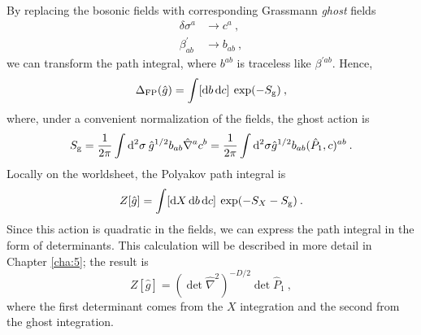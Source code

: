 By replacing the bosonic fields with corresponding Grassmann \emph{ghost} fields    
\begin{subequations} \label{3.3.19}
	\begin{align}
		\delta \sigma^{a} &\rightarrow c^{a} \:, \label{3.3.19a}\\
		\beta_{a b}^{\prime} & \rightarrow b_{a b} \:, \label{3.3.19b}
	\end{align}
\end{subequations}
we can transform the path integral, where $b^{a b}$ is traceless like $\beta^{\prime a b}$.    
Hence,    
\begin{equation}
	\Delta_{\mathrm{FP}}(\hat{g})=\int[\mathrm{d} b\, \mathrm{d} c] \: \exp (-S_{\mathrm{g}}) \:, \label{3.3.20}
\end{equation}
where, under a convenient normalization of the fields, the ghost action is    
\begin{equation}\label{3.3.21}
	S_{\mathrm{g}}=\frac{1}{2 \pi} \int \mathrm{d}^{2} \sigma \: \hat{g}^{1 / 2} b_{a b} \hat{\nabla}^{a} c^{b}=\frac{1}{2 \pi} \int \mathrm{d}^{2} \sigma \hat{g}^{1 / 2} b_{a b}(\hat{P}_{1}, c)^{a b} \:.
\end{equation}
Locally on the worldsheet, the Polyakov path integral is    
\begin{equation}\label{3.3.22}
	Z[\hat{g}]=\int[\mathrm{d} X\, \mathrm{d} b\, \mathrm{d} c]\: \exp (-S_{X}-S_{\mathrm{g}}) \:. 
\end{equation}
Since this action is quadratic in the fields, we can express the path integral in the form of determinants. This calculation will be described in more detail in Chapter \ref{cha:5};    
the result is    
\begin{equation}
	Z[\hat{g}]=(\operatorname{det} \hat{\nabla}^{2})^{-D / 2} \operatorname{det} \hat{P}_{1} \:, \label{3.3.23}
\end{equation}
where the first determinant comes from the $X$ integration and the second from the ghost integration.    

